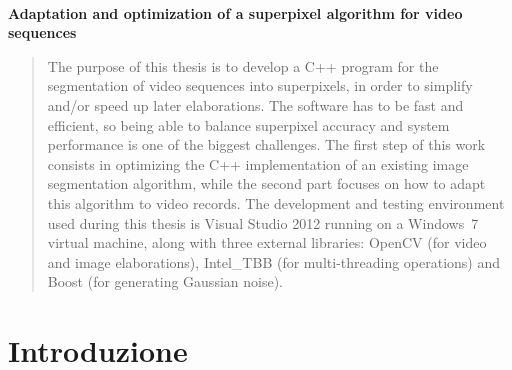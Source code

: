 \documentclass[12pt,a4paper,oneside]{article}
\begin{document}
\begin{spacing}{1.3}
	\vspace{2cm}
	
	\begin{center}
		\noindent\hrulefill\\
		\noindent{}
	\end{center}	
\end{spacing}
\newpage



\begin{center}
	\textbf{\Large Adaptation and optimization of a superpixel algorithm for video sequences}
\end{center}
\bigskip \bigskip
\begin{abstract}
\noindent The purpose of this thesis is to develop a \mbox{C++} program for the segmentation of video sequences into superpixels, in order to simplify and/or speed up later elaborations. The software has to be fast and efficient, so being able to balance superpixel accuracy and system performance is one of the biggest challenges. The first step of this work consists in optimizing the \mbox{C++} implementation of an existing image segmentation algorithm, while the second part focuses on how to adapt this algorithm to video records. The development and testing environment used during this thesis is Visual Studio 2012 running on a Windows~7 virtual machine, along with three external libraries: \acrshort{OpenCV} (for video and image elaborations), \acrshort{Intel_TBB} (for multi-threading operations) and Boost (for generating Gaussian noise). 
\end{abstract}
\newpage



\begin{spacing}{1.6}
\printglossary[type=\acronymtype,title={Simboli e abbreviazioni}]
\end{spacing}
\newpage


\nocite{GEORGIU}
\tableofcontents
\newpage

\listoffigures
\listofalgorithms
\newpage



\listoftables
\newpage



\section{Introduzione}\label{Introduzione}
\end{document}
